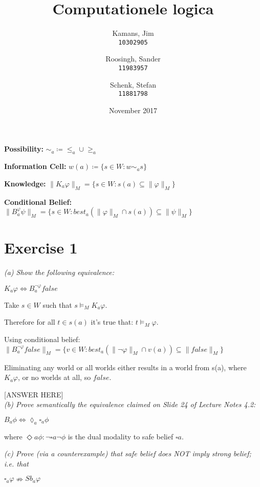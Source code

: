 \documentclass[leqno]{article}
\title{Computationele logica}
\author{
    Kamans, Jim\\
    \texttt{10302905}
    \and
    Roosingh, Sander\\
    \texttt{11983957}
    \and
    Schenk, Stefan\\
    \texttt{11881798}
}
\date{November 2017}
\begin{document}
\maketitle

\textbf{Possibility:} $\sim_a \coloneqq \leq_a \cup \geq_a$

\textbf{Information Cell:} $w(a) \coloneqq \{s\in W:w\sim_a s\}$

\textbf{Knowledge:} $\lVert K_a \varphi \rVert_M = \{s\in W:s(a) \subseteq
\lVert \varphi \rVert_M\}$

\textbf{Conditional Belief:} $\lVert B_a^\varphi \psi \rVert_M = \{s \in
W:best_a(\lVert\varphi\rVert_M \cap s(a)) \subseteq \lVert\psi\rVert_M\}$


\section*{Exercise 1}

\textit{(a) Show the following equivalence:}
\begin{center}
    $K_a \varphi \Leftrightarrow B_a^{\neg \varphi} false$
\end{center}

Take $s \in W$ such that $s \models_M K_a \varphi$.

Therefore for all $t \in s(a)$ it's true that: $t \models_M
\varphi$.

Using conditional belief:
$\lVert B_a^{\neg \varphi}false\rVert_M=\{v\in W:best_a(\lVert\neg\varphi\rVert_M\cap v(a))\subseteq\lVert false\rVert_M\}$

Eliminating any world or all worlds either results in a world from s(a), where $K_a \varphi$, or no worlds at all, so $false$.

[ANSWER HERE] \\


\textit{(b) Prove semantically the equivalence claimed on Slide 24 of Lecture
Notes 4.2:}
\begin{center}
    $B_a \phi \Leftrightarrow \lozenge_a \square_a \phi$
\end{center}
where $\Diamond a \phi : \neg \square a \neg \phi$ is the dual modality to safe
belief $\square a$.





\textit{(c) Prove (via a counterexample) that safe belief does NOT imply strong
belief; i.e. that}
\begin{center}
    $\square_a \varphi \nRightarrow Sb_a \varphi$
\end{center}
\end{document}
